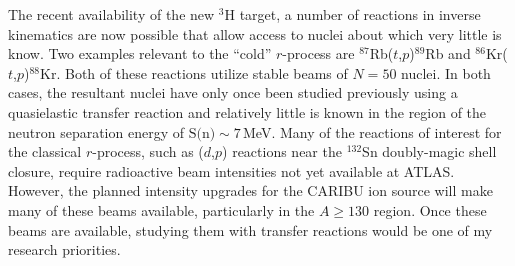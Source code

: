The recent availability of the new $^3$H target, a number of reactions in inverse kinematics are now possible that %
allow access to nuclei about which very little is know. Two examples relevant to the ``cold'' $r$-process are $^{87}$Rb($t$,$p$)$^{89}$Rb and $^{86}$Kr($t$,$p$)$^{88}$Kr. Both of these reactions utilize stable beams of $N=50$ nuclei. In both cases, the resultant nuclei have 
only once been studied previously using a quasielastic transfer reaction and relatively little is known in the region of the neutron separation energy of $\textrm{S(n)}\sim 7$\,MeV.
Many of the reactions of interest for the classical $r$-process, such as ($d$,$p$) reactions near the $^{132}$Sn doubly-magic shell closure, require radioactive beam intensities not yet available at ATLAS. However, the planned intensity upgrades for the CARIBU ion source will make many of these %
 beams available, particularly in the $A \geq 130$ region. Once these beams are available, studying them with transfer reactions would be one of my research priorities. 


%
%


